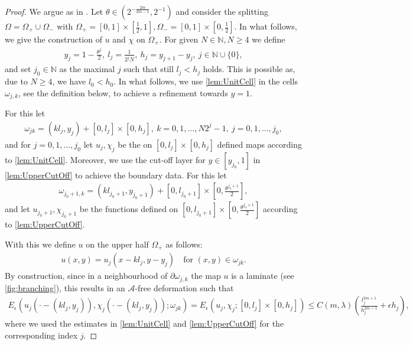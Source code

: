 \documentclass[a4paper, 10pt, twoside, notitlepage]{amsart}
\theoremstyle{plain}
\newcommand{\N}{\mathbb{N}}
\newcommand{\p}{\partial}
\newcommand{\A}{\mathcal{A}}
\begin{document}
		\begin{proof}
			We argue as in \cite{CC15,RRT22,RT22}.  Let $\theta \in (2^{-\frac{2m}{2m-1}},2^{-1})$ and consider the splitting $\Omega = \Omega_+ \cup \Omega_-$ with
			$\Omega_+ = [0,1] \times [\frac{1}{2},1], \Omega_- = [0,1] \times [0,\frac{1}{2}]$.  In what follows, we give the construction of $u$ and $\chi$ on $\Omega_+$.  For given $N \in \N, N \geq 4$ we
			define
			\begin{align*}
				y_j = 1 - \frac{\theta^j}{2}, \ l_j = \frac{1}{2^jN}, \ h_j = y_{j+1} - y_j, \ j \in \N \cup \{0\},
			\end{align*}
			and set $j_0 \in \N$ as the maximal $j$ such that still $l_j < h_j$ holds. This is possible as, due to $N \geq 4$, we have $l_0 < h_0$.  In what follows, we use \cref{lem:UnitCell} in the cells $\omega_{j,k}$, see the definition below, to achieve a
			refinement towards $y = 1$.
			
			For this let
			\begin{align*}
				\omega_{jk} = (kl_j,y_j) + [0,l_j] \times [0,h_j], \  k = 0,1,\dots,N2^{j}-1, \ j = 0,1,\dots,j_0,
			\end{align*}
			and for $j = 0,1,\dots,j_0$ let $u_j, \chi_j$ be the on $ [0,l_j] \times [0,h_j] $ defined maps according to \cref{lem:UnitCell}.  Moreover, we use the cut-off layer for $y \in [y_{j_0},1]$ in
			\cref{lem:UpperCutOff} to achieve the boundary data.  For this let
			\begin{align*}
				\omega_{j_0+1,k} = (kl_{j_0+1},y_{j_0+1}) + [0,l_{j_0+1}] \times [0,\frac{\theta^{j_0+1}}{2}],
			\end{align*}
			and let $u_{j_0+1},\chi_{j_0+1}$ be the functions defined on $[0,l_{j_0+1}] \times [0,\frac{\theta^{j_0+1}}{2}]$ according to \cref{lem:UpperCutOff}.
			
			
			With this we define $u$ on the upper half $\Omega_+$ as follows:
			\begin{align*}
				u(x,y) = u_j(x-kl_j,y-y_j) \quad \text{for } (x,y) \in \omega_{jk}.
			\end{align*}
			By construction, since in a neighbourhood of $\p\omega_{j,k}$ the map $u$ is a laminate (see \cref{fig:branching}), this results in an $\A$-free deformation such that
				\begin{align*}
					E_\epsilon(u_j(\cdot - (kl_j,y_j)),\chi_j(\cdot - (kl_j,y_j));\omega_{jk}) = E_\epsilon(u_j,\chi_j;[0,l_j] \times [0,h_j]) \leq C(m,\lambda) (\frac{l_j^{2m+1}}{h_j^{2m-1}} + \epsilon h_j),
				\end{align*}
				where we used the estimates in \cref{lem:UnitCell} and \cref{lem:UpperCutOff} for the corresponding index $j$.
			

\end{proof}
\end{document}
